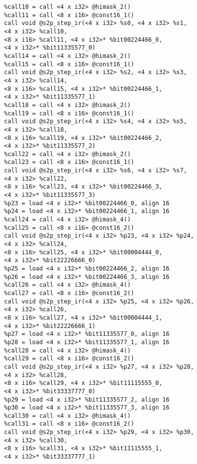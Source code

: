 \begin{lstlisting}
  %call10 = call <4 x i32> @himask_2()
  %call11 = call <8 x i16> @const16_1()
  call void @s2p_step_ir(<4 x i32> %s0, <4 x i32> %s1,
  <4 x i32> %call10,
  <8 x i16> %call11, <4 x i32>* %bit00224466_0,
  <4 x i32>* %bit11335577_0)
  %call14 = call <4 x i32> @himask_2()
  %call15 = call <8 x i16> @const16_1()
  call void @s2p_step_ir(<4 x i32> %s2, <4 x i32> %s3,
  <4 x i32> %call14,
  <8 x i16> %call15, <4 x i32>* %bit00224466_1,
  <4 x i32>* %bit11335577_1)
  %call18 = call <4 x i32> @himask_2()
  %call19 = call <8 x i16> @const16_1()
  call void @s2p_step_ir(<4 x i32> %s4, <4 x i32> %s5,
  <4 x i32> %call18,
  <8 x i16> %call19, <4 x i32>* %bit00224466_2,
  <4 x i32>* %bit11335577_2)
  %call22 = call <4 x i32> @himask_2()
  %call23 = call <8 x i16> @const16_1()
  call void @s2p_step_ir(<4 x i32> %s6, <4 x i32> %s7,
  <4 x i32> %call22,
  <8 x i16> %call23, <4 x i32>* %bit00224466_3,
  <4 x i32>* %bit11335577_3)
  %p23 = load <4 x i32>* %bit00224466_0, align 16
  %p24 = load <4 x i32>* %bit00224466_1, align 16
  %call24 = call <4 x i32> @himask_4()
  %call25 = call <8 x i16> @const16_2()
  call void @s2p_step_ir(<4 x i32> %p23, <4 x i32> %p24,
  <4 x i32> %call24,
  <8 x i16> %call25, <4 x i32>* %bit00004444_0,
  <4 x i32>* %bit22226666_0)
  %p25 = load <4 x i32>* %bit00224466_2, align 16
  %p26 = load <4 x i32>* %bit00224466_3, align 16
  %call26 = call <4 x i32> @himask_4()
  %call27 = call <8 x i16> @const16_2()
  call void @s2p_step_ir(<4 x i32> %p25, <4 x i32> %p26,
  <4 x i32> %call26,
  <8 x i16> %call27, <4 x i32>* %bit00004444_1,
  <4 x i32>* %bit22226666_1)
  %p27 = load <4 x i32>* %bit11335577_0, align 16
  %p28 = load <4 x i32>* %bit11335577_1, align 16
  %call28 = call <4 x i32> @himask_4()
  %call29 = call <8 x i16> @const16_2()
  call void @s2p_step_ir(<4 x i32> %p27, <4 x i32> %p28,
  <4 x i32> %call28,
  <8 x i16> %call29, <4 x i32>* %bit11115555_0,
  <4 x i32>* %bit33337777_0)
  %p29 = load <4 x i32>* %bit11335577_2, align 16
  %p30 = load <4 x i32>* %bit11335577_3, align 16
  %call30 = call <4 x i32> @himask_4()
  %call31 = call <8 x i16> @const16_2()
  call void @s2p_step_ir(<4 x i32> %p29, <4 x i32> %p30,
  <4 x i32> %call30,
  <8 x i16> %call31, <4 x i32>* %bit11115555_1,
  <4 x i32>* %bit33337777_1)


\end{lstlisting}
